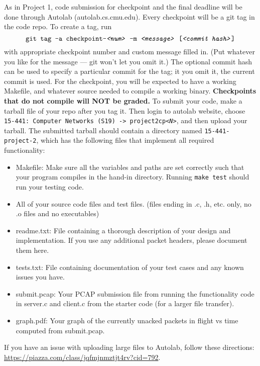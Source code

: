 
As in Project 1, code submission for checkpoint and the final deadline will be done 
through {Autolab (autolab.cs.cmu.edu).}
Every checkpoint will be a git tag in the code repo. To create a tag, run
\[
\texttt{git tag -a checkpoint-\textit{<num>} -m \textit{<message>} [\textit{<commit hash>}]}
\]
with appropriate checkpoint number and custom message filled in. (Put whatever
you like for the message --- git won't let you omit it.) The optional commit
hash can be used to specify a particular commit for the tag; it you omit it,
the current commit is used. 
\noindent For the checkpoint, you will be expected to have a working Makefile, and 
whatever source needed to compile a working binary.  \textbf{Checkpoints that do not compile will
NOT be graded.}  
{To submit your code, make a tarball file of your repo after you tag it. Then login to autolab website,
choose \texttt{15-441: Computer Networks (S19) -> project2cp<{\it N}>}, and then upload your tarball.}
The submitted tarball should contain a directory named \texttt{15-441-project-2}, which has 
the following files that implement all required functionality:
\begin{itemize}
\item Makefile:  Make sure all the variables and paths are set correctly such 
that your program compiles in the hand-in directory. Running \texttt{make test} should run your testing code.
\item All of your source code files and test files. (files ending in .c, .h, etc. only, no .o files and no executables)
\item readme.txt: File containing a thorough description of your design and implementation. If you use any additional packet headers, please document them 
here. 
\item tests.txt: File containing documentation of your test cases and any known issues you have.

\item submit.pcap: Your PCAP submission file from running the functionality code in server.c and client.c from the starter code (for a larger file transfer). 

\item graph.pdf: Your graph of the currently unacked packets in flight vs time computed from submit.pcap. 
\end{itemize}

If you have an issue with uploading large files to Autolab, follow these directions: \url{https://piazza.com/class/jqfmjnmztjt4rv?cid=792}.


